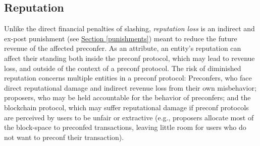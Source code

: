 \documentclass[a4paper]{article}
\theoremstyle{boldstyle}
\newcommand{\cm}[1]{\textcolor{blue}{\textbf{Conor:} #1}}
\newcommand{\ks}[1]{\textcolor{purple}{\textbf{Katerina:} #1}}
\begin{document}
\subsection{Reputation} \label{ReputationRisk}
    Unlike the direct financial penalties of slashing, \emph{reputation loss} is an indirect and ex-post punishment (see \hyperref[punishments]{Section \ref{punishments}}) meant to reduce the future revenue of the affected preconfer. 
    As an attribute, an entity's reputation can affect their standing both inside the preconf protocol, which may lead to revenue loss, and outside of the context of a preconf protocol.
    The risk of diminished reputation concerns multiple entities in a preconf protocol: Preconfers, who face direct reputational damage and indirect revenue loss from their own misbehavior; proposers, who may be held accountable for the behavior of preconfers; and the blockchain protocol, which may suffer reputational damage if preconf protocols are perceived by users to be unfair or extractive (e.g., proposers allocate most of the block-space to preconfed transactions, leaving little room for users who do not want to preconf their transaction).
\end{document}
